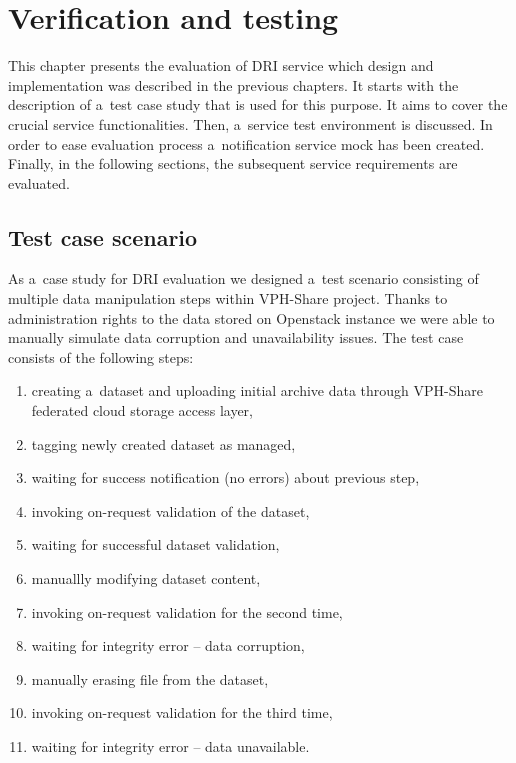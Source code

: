 \chapter{Verification and testing}
\label{cha:testing}

This chapter presents the evaluation of DRI service which design and implementation
was described in the previous chapters. It starts with the description of a~test case
study that is used for this purpose. It aims to cover the crucial service functionalities. Then, a~service
test environment is discussed. In order to ease evaluation process a~notification service
mock has been created. Finally, in the following sections, the subsequent service requirements
are evaluated.


\section{Test case scenario}
\label{case-study}
As a~case study for DRI evaluation we designed a~test scenario consisting of multiple
data manipulation steps within VPH-Share project. Thanks to administration rights to the
data stored on Openstack instance we were able to manually simulate data corruption and
unavailability issues. The test case consists of the following steps:

\begin{enumerate}
\item creating a~dataset and uploading initial archive data through VPH-Share federated cloud
storage access layer,
\item tagging newly created dataset as managed,
\item waiting for success notification (no errors) about previous step,
\item invoking on-request validation of the dataset,
\item waiting for successful dataset validation,
\item manuallly modifying dataset content,
\label{manual-modification}
\item invoking on-request validation for the second time,
\item waiting for integrity error -- data corruption,
\item manually erasing file from the dataset,
\item invoking on-request validation for the third time,
\item waiting for integrity error -- data unavailable. 
\end{enumerate}

